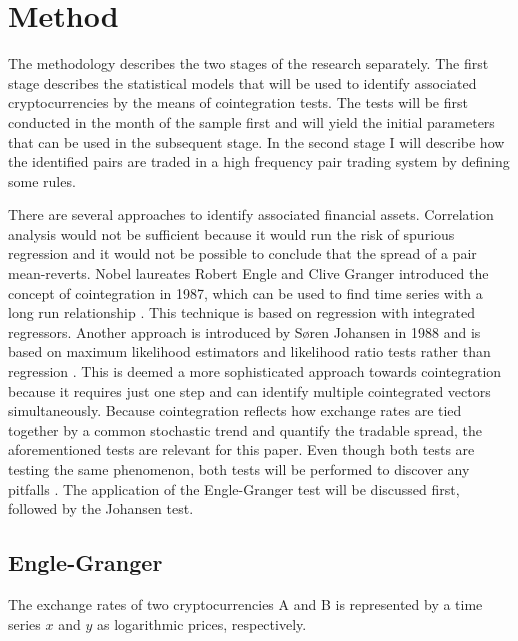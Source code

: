 \documentclass[12pt,english,authoryear]{article}
\begin{document}
\section{Method} \label{sec:Method}

The methodology describes the two stages of the research separately. The first stage describes the statistical models that will be used to identify associated cryptocurrencies by the means of cointegration tests. The tests will be first conducted in the month of the sample first and will yield the initial parameters that can be used in the subsequent stage. In the second stage I will describe how the identified pairs are traded in a high frequency pair trading system by defining some rules.  

There are several approaches to identify associated financial assets. Correlation analysis would not be sufficient because it would run the risk of spurious regression and it would not be possible to conclude that the spread of a pair mean-reverts. Nobel laureates Robert Engle and Clive Granger introduced the concept of cointegration in 1987, which can be used to find time series with a long run relationship \cite{Engle_1987}. This technique is based on regression with integrated regressors. Another approach is introduced by Søren Johansen in 1988 and is based on maximum likelihood estimators and likelihood ratio tests rather than regression \cite{Johansen_1988}. This is deemed a more sophisticated approach towards cointegration because it requires just one step and can identify multiple cointegrated vectors simultaneously. Because cointegration reflects how exchange rates are tied together by a common stochastic trend and quantify the tradable spread, the aforementioned tests are relevant for this paper. Even though both tests are testing the same phenomenon, both tests will be performed to discover any pitfalls \cite{Gonzalo_1998}. The application of the Engle-Granger test will be discussed first, followed by the Johansen test.

\subsection{Engle-Granger} \label{sec:Engle-Granger}

The exchange rates of two cryptocurrencies A and B is represented by a time series $x$ and $y$ as logarithmic prices, respectively. 
\end{document}
